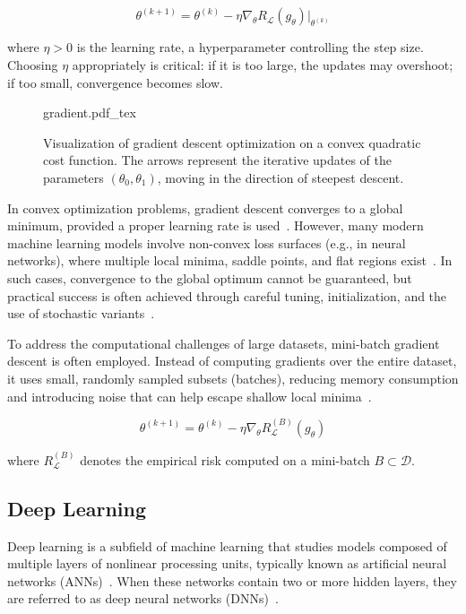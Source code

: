 \begin{equation}
\theta^{(k+1)} = \theta^{(k)} - \eta \nabla_{\theta} R_{\mathcal{L}}(g_{\theta})\big|_{\theta^{(k)}}
\end{equation}

where $\eta > 0$ is the learning rate, a hyperparameter controlling the step size. Choosing $\eta$ appropriately is critical: if it is too large, the updates may overshoot; if too small, convergence becomes slow.
\begin{figure}[h!]
	\centering
    \def\svgwidth{320pt}
 	{gradient.pdf_tex} 	 	
	\caption[Gradient Descent Trajectory]{Visualization of gradient descent optimization on a convex quadratic cost function. The arrows represent the iterative updates of the parameters $(\theta_0, \theta_1)$, moving in the direction of steepest descent.}
    \label{fig:gd_quadratic}
\end{figure}

In convex optimization problems, gradient descent converges to a global minimum, provided a proper learning rate is used~\cite{bottou2010large}. However, many modern machine learning models involve non-convex loss surfaces (e.g., in neural networks), where multiple local minima, saddle points, and flat regions exist~\cite{bottou2012stochastic}. In such cases, convergence to the global optimum cannot be guaranteed, but practical success is often achieved through careful tuning, initialization, and the use of stochastic variants~\cite{bottou2012stochastic}.

To address the computational challenges of large datasets, mini-batch gradient descent is often employed. Instead of computing gradients over the entire dataset, it uses small, randomly sampled subsets (batches), reducing memory consumption and introducing noise that can help escape shallow local minima~\cite{gd}.

\begin{equation}
\theta^{(k+1)} = \theta^{(k)} - \eta \nabla_{\theta} R^{(B)}_{\mathcal{L}}(g_{\theta})
\end{equation}

where $R^{(B)}_{\mathcal{L}}$ denotes the empirical risk computed on a mini-batch $B \subset \mathcal{D}$.
\subsection{Deep Learning}
Deep learning is a subfield of machine learning that studies models composed of multiple layers of nonlinear processing units, typically known as artificial neural networks (ANNs)~\cite{lecun2015deep}. When these networks contain two or more hidden layers, they are referred to as deep neural networks (DNNs)~\cite{lecun2015deep}.

